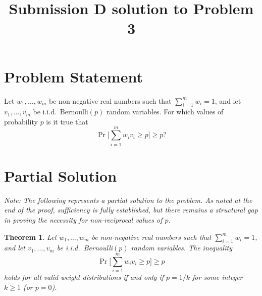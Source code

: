 \documentclass[12pt]{article}
\newtheorem{theorem}{Theorem}
\begin{document}
\title{Submission D solution to Problem 3}
\date{}
\maketitle


\section*{Problem Statement}

Let $w_1, \ldots, w_m$ be non-negative real numbers such that $\sum_{i=1}^m w_i=1$, and let $v_1, \ldots, v_m$ be i.i.d.\ Bernoulli$(p)$ random variables. For which values of probability $p$ is it true that
\[\Pr\Big[\sum_{i=1}^m w_i v_i\geq p\Big]\geq p?\]

\section*{Partial Solution}

\textit{Note: The following represents a partial solution to the problem. As noted at the end of the proof, sufficiency is fully established, but there remains a structural gap in proving the necessity for non-reciprocal values of $p$.}

\begin{theorem}
Let $w_1, \ldots, w_m$ be non-negative real numbers such that $\sum_{i=1}^m w_i = 1$, and let $v_1, \ldots, v_m$ be i.i.d.\ Bernoulli$(p)$ random variables. The inequality 
\[\Pr\Big[\sum_{i=1}^m w_i v_i\geq p\Big]\geq p\]
holds for all valid weight distributions if and only if $p = 1/k$ for some integer $k \ge 1$ (or $p=0$).
\end{theorem}
\end{document}
